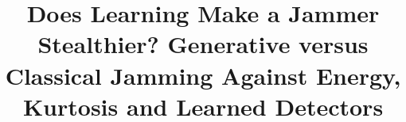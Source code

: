 \title{Does Learning Make a Jammer Stealthier? Generative versus Classical Jamming Against Energy, Kurtosis and Learned Detectors}
